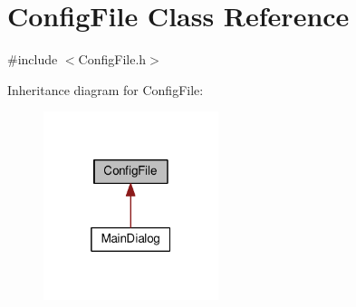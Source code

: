 \hypertarget{classConfigFile}{}\section{Config\+File Class Reference}
\label{classConfigFile}


{\ttfamily \#include $<$Config\+File.\+h$>$}



Inheritance diagram for Config\+File\+:
\nopagebreak
\begin{figure}[H]
\begin{center}
\leavevmode
\includegraphics[width=145pt]{classConfigFile__inherit__graph}
\end{center}
\end{figure}

